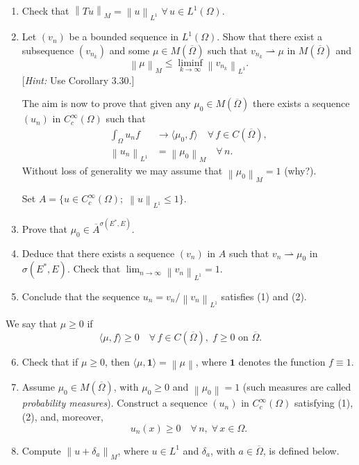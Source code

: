 \documentclass[12pt]{article}
\newcommand{\norm}[1]{\left\|#1\right\|}
\newcommand{\ip}[2]{\langle #1, #2 \rangle}
\begin{document}
\begin{enumerate}
\item Check that $\norm{Tu}_M = \norm{u}_{L^1}$ $\forall\, u \in L^1(\Omega)$.
 
 
\item Let $(v_n)$ be a bounded sequence in $L^1(\Omega)$. Show that there exist a subsequence
$(v_{n_k})$ and some $\mu \in M(\overline{\Omega})$ such that $v_{n_k} \rightharpoonup \mu$ in $M(\overline{\Omega})$ and
\[
\norm{\mu}_M \le \liminf_{k\to\infty} \norm{v_{n_k}}_{L^1}.
\]
[\textit{Hint:} Use Corollary 3.30.]
 
\noindent The aim is now to prove that given any $\mu_0 \in M(\overline{\Omega})$ there exists a sequence $(u_n)$
in $C^\infty_c(\Omega)$ such that
\begin{align}
\int_\Omega u_n f &\to \ip{\mu_0}{f} \quad \forall\, f \in C(\overline{\Omega}), \tag{1}\\
\norm{u_n}_{L^1} &= \norm{\mu_0}_M \quad \forall\, n. \tag{2}
\end{align}
Without loss of generality we may assume that $\norm{\mu_0}_M = 1$ (why?).
 
Set $A = \{u \in C^\infty_c(\Omega);\; \norm{u}_{L^1} \le 1\}$.
 
\item Prove that $\mu_0 \in \overline{A}^{\sigma(E^*,E)}$.
 
 
\item Deduce that there exists a sequence $(v_n)$ in $A$ such that $v_n \rightharpoonup \mu_0$ in $\sigma(E^*,E)$.
Check that $\lim_{n\to\infty}\norm{v_n}_{L^1} = 1$.
 
\item Conclude that the sequence $u_n = v_n/\norm{v_n}_{L^1}$ satisfies (1) and (2).
\end{enumerate}
 
\noindent We say that $\mu \ge 0$ if
\[
\ip{\mu}{f} \ge 0 \quad \forall\, f \in C(\overline{\Omega}),\; f \ge 0 \text{ on } \overline{\Omega}.
\]
 
\begin{enumerate}
\setcounter{enumi}{5}
\item Check that if $\mu \ge 0$, then $\ip{\mu}{\mathbf{1}} = \norm{\mu}$, where $\mathbf{1}$ denotes the function
$f \equiv 1$.
 
\item Assume $\mu_0 \in M(\overline{\Omega})$, with $\mu_0 \ge 0$ and $\norm{\mu_0} = 1$ (such measures are
called \emph{probability measures}). Construct a sequence $(u_n)$ in $C^\infty_c(\Omega)$ satisfying
(1), (2), and, moreover,
\begin{equation}\tag{3}
u_n(x) \ge 0 \quad \forall\, n,\; \forall\, x \in \Omega.
\end{equation}
 
\item Compute $\norm{u + \delta_a}_M$, where $u \in L^1$ and $\delta_a$, with $a \in \overline{\Omega}$, is defined below.
\end{enumerate}
 
\end{document}
